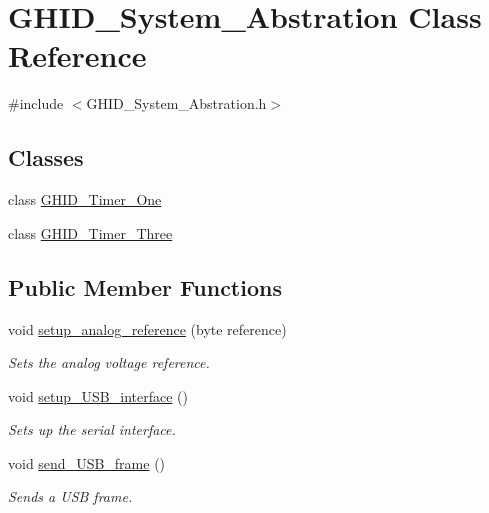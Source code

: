 \hypertarget{class_g_h_i_d___system___abstration}{\section{\-G\-H\-I\-D\-\_\-\-System\-\_\-\-Abstration \-Class \-Reference}
\label{class_g_h_i_d___system___abstration}
}


{\ttfamily \#include $<$\-G\-H\-I\-D\-\_\-\-System\-\_\-\-Abstration.\-h$>$}

\subsection*{\-Classes}
\begin{DoxyCompactItemize}
\item 
class \hyperlink{class_g_h_i_d___system___abstration_1_1_g_h_i_d___timer___one}{\-G\-H\-I\-D\-\_\-\-Timer\-\_\-\-One}
\item 
class \hyperlink{class_g_h_i_d___system___abstration_1_1_g_h_i_d___timer___three}{\-G\-H\-I\-D\-\_\-\-Timer\-\_\-\-Three}
\end{DoxyCompactItemize}
\subsection*{\-Public \-Member \-Functions}
\begin{DoxyCompactItemize}
\item 
void \hyperlink{class_g_h_i_d___system___abstration_a6ba16e9025a2f2d85acc7ddccfb70517}{setup\-\_\-analog\-\_\-reference} (byte reference)
\begin{DoxyCompactList}\small\item\em \-Sets the analog voltage reference. \end{DoxyCompactList}\item 
void \hyperlink{class_g_h_i_d___system___abstration_a12335f35cef2bc0829791c05ab3c261e}{setup\-\_\-\-U\-S\-B\-\_\-interface} ()
\begin{DoxyCompactList}\small\item\em \-Sets up the serial interface. \end{DoxyCompactList}\item 
void \hyperlink{class_g_h_i_d___system___abstration_ad850bc61e442ec99f8da772768f820a6}{send\-\_\-\-U\-S\-B\-\_\-frame} ()
\begin{DoxyCompactList}\small\item\em \-Sends a \-U\-S\-B frame. \end{DoxyCompactList}\end{DoxyCompactItemize}
